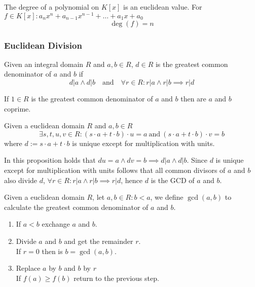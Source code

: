 \begin{proposition}
   The degree of a polynomial on \(K[x]\) is an euclidean value.
   For \(f \in K[x]: a_nx^n + a_{n-1}x^{n-1} + \ldots + a_1x + a_0\)
   \[\deg(f) = n\]
\end{proposition}

\subsubsection{Euclidean Division}
\begin{definition}
   Given an integral domain \(R\) and \(a, b \in R\), \(d \in R\) is the greatest common denominator of \(a\) and \(b\) if
   \[d|a \land d|b \quad\text{and}\quad \forall r \in R: r|a \land r|b \implies r|d\]
\end{definition}
\begin{remark}
   If \(1 \in R\) is the greatest common denominator of \(a\) and \(b\) then are \(a\) and \(b\) coprime.
\end{remark}

\begin{proposition}\label{pro:factor_unique}
   Given a euclidean domain \(R\) and \(a, b \in R\)
   \[\exists s, t, u, v \in R: (s \cdot a + t \cdot b) \cdot u = a~\text{and}~(s \cdot a + t \cdot b) \cdot v = b\]
   where \(d := s \cdot a + t \cdot b\) is unique except for multiplication with units.
\end{proposition}
\begin{remark}
   In this proposition holds that \(du = a \land dv = b \implies d|a \land d|b\).
   Since \(d\) is unique except for multiplication with units follows that all common divisors of \(a\) and \(b\) also divide \(d\), \(\forall r \in R: r|a \land r|b \implies r|d\), hence \(d\) is the GCD of \(a\) and \(b\).
\end{remark}

\begin{definition}
   Given a euclidean domain \(R\), let \(a, b \in R: b < a\), we define \(\gcd(a, b)\) to calculate the greatest common denominator of \(a\) and \(b\).
   \begin{enumerate}
      \item If \(a < b\) exchange \(a\) and \(b\).
      \item Divide \(a\) and \(b\) and get the remainder \(r\).\\
         If \(r = 0\) then is \(b = \gcd(a, b)\).
      \item Replace \(a\) by \(b\) and \(b\) by \(r\)\\
         If \(f(a) \geq f(b)\) return to the previous step.
   \end{enumerate}
\end{definition}

